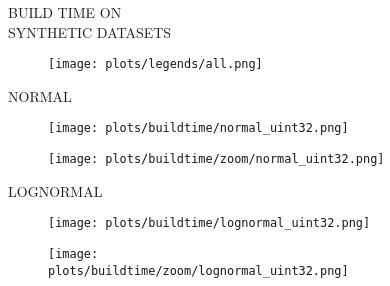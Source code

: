 \documentclass{article}
\begin{document}
\begin{figure}[!htbp]
\fbox
{
\begin{minipage}[t][0.98\textheight][t]{\textwidth}
\centering
    \begin{minipage}{0.2\linewidth}
    \footnotesize{BUILD TIME ON \\ SYNTHETIC DATASETS}
    \end{minipage}
   \begin{minipage}{0.75\linewidth}
        \begin{figure}[H]
        \texttt{[image: plots/legends/all.png]}
        \end{figure}
    \end{minipage}
    \vspace*{-10px}
    
    \begin{minipage}{0.03\linewidth}
    \begin{sideways}\small NORMAL\end{sideways}
    \end{minipage}
    \begin{minipage}{0.39\linewidth}
        \begin{figure}[H]
        \texttt{[image: plots/buildtime/normal\_uint32.png]}
        \end{figure}
    \end{minipage}
    \begin{minipage}{0.39\linewidth}
        \begin{figure}[H]
            \texttt{[image: plots/buildtime/zoom/normal\_uint32.png]}
        \end{figure}
    \end{minipage}
\vspace*{-0.55cm}

\begin{minipage}{0.03\linewidth}
    \begin{sideways}\small LOGNORMAL\end{sideways}
    \end{minipage}
    \begin{minipage}{0.39\linewidth}
        \begin{figure}[H]
        \texttt{[image: plots/buildtime/lognormal\_uint32.png]}
        \end{figure}
    \end{minipage}
    \begin{minipage}{0.39\linewidth}
        \begin{figure}[H]
            \texttt{[image: plots/buildtime/zoom/lognormal\_uint32.png]}
        \end{figure}
    \end{minipage}
\vspace*{-0.55cm}


\end{minipage}}
\end{figure}
\end{document}
